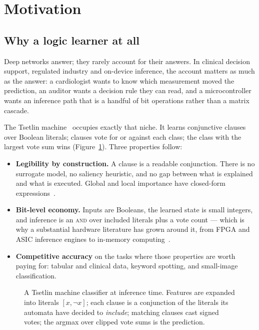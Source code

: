 \section{Motivation}
\label{sec:motivation}

\subsection{Why a logic learner at all}

Deep networks answer; they rarely account for their answers. In clinical decision support,
regulated industry and on-device inference, the account matters as much as the answer: a
cardiologist wants to know which measurement moved the prediction, an auditor wants a
decision rule they can read, and a microcontroller wants an inference path that is a handful
of bit operations rather than a matrix cascade.

The Tsetlin machine~ occupies exactly that niche. It learns conjunctive clauses
over Boolean literals; clauses vote for or against each class; the class with the largest
vote sum wins (Figure~\ref{fig:tm-overview}). Three properties follow:

\begin{itemize}[leftmargin=1.25em, itemsep=0.25em, topsep=0.35em]
  \item \textbf{Legibility by construction.} A clause is a readable conjunction. There is no
    surrogate model, no saliency heuristic, and no gap between what is explained and what is
    executed. Global and local importance have closed-form expressions~.
  \item \textbf{Bit-level economy.} Inputs are Booleans, the learned state is small integers,
    and inference is an \textsc{and} over included literals plus a vote count --- which is
    why a substantial hardware literature has grown around it, from FPGA and ASIC inference
    engines to in-memory computing~.
  \item \textbf{Competitive accuracy} on the tasks where those properties are worth paying
    for: tabular and clinical data, keyword spotting, and small-image classification.
\end{itemize}

\begin{figure}[t]
\centering
\resizebox{\linewidth}{!}{}
\caption{A Tsetlin machine classifier at inference time. Features are expanded into literals
  $[x,\lnot x]$; each clause is a conjunction of the literals its automata have decided to
  \emph{include}; matching clauses cast signed votes; the argmax over clipped vote sums is
  the prediction.}
\label{fig:tm-overview}
\end{figure}

